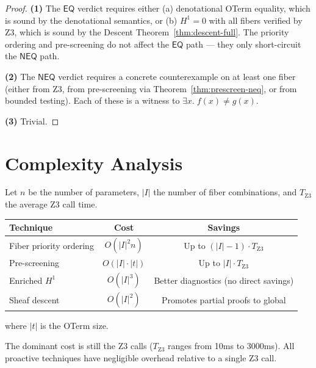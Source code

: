 \begin{proof}
\textbf{(1)} The $\mathsf{EQ}$ verdict requires either (a) denotational
OTerm equality, which is sound by the denotational semantics, or
(b) $H^1 = 0$ with all fibers verified by Z3, which is sound by the
Descent Theorem~\ref{thm:descent-full}.  The priority ordering and
pre-screening do not affect the $\mathsf{EQ}$ path --- they only
short-circuit the $\mathsf{NEQ}$ path.

\textbf{(2)} The $\mathsf{NEQ}$ verdict requires a concrete
counterexample on at least one fiber (either from Z3, from
pre-screening via Theorem~\ref{thm:prescreen-neq}, or from
bounded testing).  Each of these is a witness to
$\exists x.\; f(x) \neq g(x)$.

\textbf{(3)} Trivial.
\end{proof}


\section{Complexity Analysis}
\label{sec:complexity}

\begin{proposition}
\label{prop:complexity}
Let $n$ be the number of parameters, $|I|$ the number of fiber
combinations, and $T_{\mathrm{Z3}}$ the average Z3 call time.
\begin{center}
\begin{tabular}{lcc}
\toprule
\textbf{Technique} & \textbf{Cost} & \textbf{Savings} \\
\midrule
Fiber priority ordering & $O(|I|^2 n)$ & Up to $(|I|-1) \cdot T_{\mathrm{Z3}}$ \\
Pre-screening & $O(|I| \cdot |t|)$ & Up to $|I| \cdot T_{\mathrm{Z3}}$ \\
Enriched $H^1$ & $O(|I|^3)$ & Better diagnostics (no direct savings) \\
Sheaf descent & $O(|I|^2)$ & Promotes partial proofs to global \\
\bottomrule
\end{tabular}
\end{center}
where $|t|$ is the OTerm size.

The dominant cost is still the Z3 calls ($T_{\mathrm{Z3}}$ ranges
from 10ms to 3000ms).  All proactive techniques have negligible
overhead relative to a single Z3 call.
\end{proposition}

